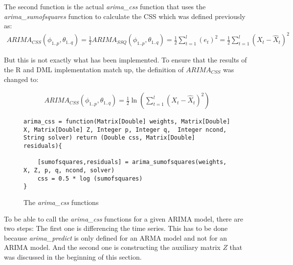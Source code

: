 The second function is the actual \textit{arima\_css} function that uses the \textit{arima\_sumofsquares} function to calculate the \acl{CSS} which was defined previously as:
\begin{equation*}
    \begin{array}{rcl}
        ARIMA_{CSS}(\phi_{1..p}, \theta_{1..q}) = \frac{1}{2} ARIMA_{SSQ}(\phi_{1..p}, \theta_{1..q}) = \frac{1}{2} \displaystyle\sum_{t=1}^{l} (e_t)^2 = \frac{1}{2}\displaystyle\sum_{t=1}^{l} (X_t - \hat{X}_t)^2
    \end{array}
\end{equation*}

But this is not exactly what has been implemented. To ensure that the results of the R and \acs{DML} implementation match up, the definition of $ARIMA_{CSS}$ was changed to:

\begin{equation*}
    \begin{array}{rcl}
        ARIMA_{CSS}(\phi_{1..p}, \theta_{1..q}) = \frac{1}{2} \ln{(\displaystyle\sum_{t=1}^{l} (X_t - \hat{X}_t)^2)}
    \end{array}
\end{equation*}


\begin{figure}[!ht]
\centering
\begin{verbatim}
arima_css = function(Matrix[Double] weights, Matrix[Double] X, Matrix[Double] Z, Integer p, Integer q,  Integer ncond, String solver) return (Double css, Matrix[Double] residuals){
    
    [sumofsquares,residuals] = arima_sumofsquares(weights, X, Z, p, q, ncond, solver)
    css = 0.5 * log (sumofsquares)
}
\end{verbatim}
\vspace*{-0.3cm}
\caption{The \textit{arima\_css} functions}
\label{fig:arima_css}
\end{figure}


To be able to call the \textit{arima\_css} functions for a given \acs{ARIMA} model, there are two steps: The first one is differencing the time series. This has to be done because \textit{arima\_predict} is only defined for an \acs{ARMA} model and not for an \acs{ARIMA} model. And the second one is constructing the auxiliary matrix $Z$ that was discussed in the beginning of this section.

